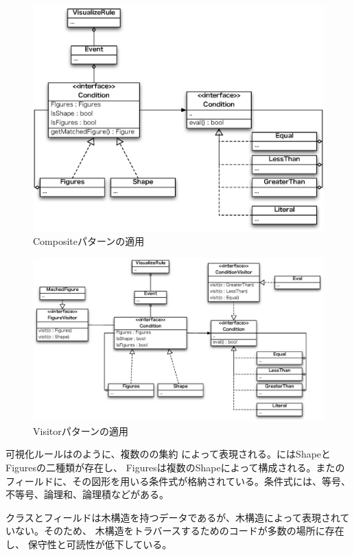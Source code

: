 \begin{figure}
\centering
\includegraphics[width=\textwidth]{composite.eps}
\caption{Compositeパターンの適用}\label{fig:composite}
\end{figure}

\begin{figure}
\centering
\includegraphics[width=\textwidth]{visitor.eps}
\caption{Visitorパターンの適用}\label{fig:visitor}
\end{figure}

可視化ルールはのように、複数のの集約
によって表現される。にはShapeとFiguresの二種類が存在し、
Figuresは複数のShapeによって構成される。またの
フィールドに、その図形を用いる条件式が格納されている。条件式には、等号、
不等号、論理和、論理積などがある。

クラスとフィールドは木構造を持つデータであるが、木構造によって表現されていない。そのため、
木構造をトラバースするためのコードが多数の場所に存在し、
保守性と可読性が低下している。

